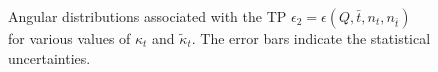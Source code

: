 \documentclass[aps,preprint,tightenlines,floatfix,superscriptaddress,nofootinbib,showpacs]{revtex4-1}
\def\tbar{\bar{t}}
\def\kp{\kappa_t}
\def\kpt{\tilde{\kappa}_t}
\def\TPb{\epsilon(Q,\tbar,n_t,n_{\tbar})}
\providecommand{\DIFadd}[1]{{\protect\color{blue}\uwave{#1}}} %
\providecommand{\DIFdel}[1]{{\protect\color{red}\sout{#1}}}                      %
\providecommand{\DIFaddFL}[1]{\DIFadd{#1}} %
\providecommand{\DIFdelFL}[1]{\DIFdel{#1}} %
\providecommand{\DIFaddbeginFL}{} %
\providecommand{\DIFaddendFL}{} %
\providecommand{\DIFdelbeginFL}{} %
\providecommand{\DIFdelendFL}{} %
\begin{document}
\begin{center}
\begin{figure}[H]
{}\DIFdelendFL \DIFaddbeginFL \DIFaddFL{\hspace*{-0.56cm}
}\DIFaddendFL %
\DIFdelbeginFL %
\DIFdelFL{\hspace*{-0.006\textwidth}
}%
\DIFdelendFL \DIFaddbeginFL {}
\DIFaddFL{\hspace*{0.002\textwidth}
}
\DIFaddendFL \caption{Angular distributions associated with the TP $\epsilon_2 = \TPb$ for
  various values of $\kp$ and $\kpt$. The error bars indicate the statistical
  uncertainties.}
\label{fig6}
\end{figure}
\end{center}
\end{document}
